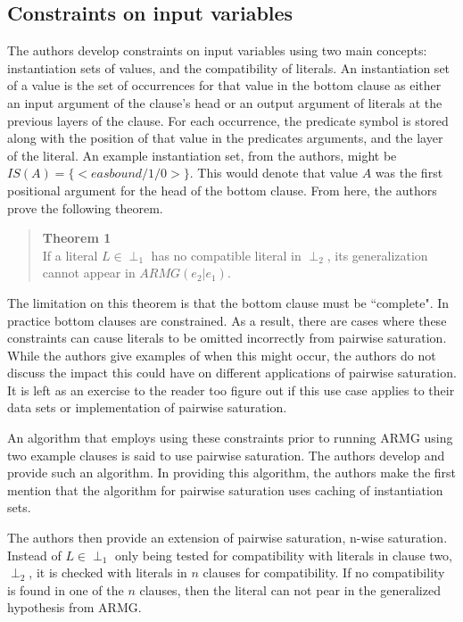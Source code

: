 \documentclass[jair,twoside,11pt,theapa]{article}
\begin{document}
\subsection{Constraints on input variables}
The authors develop constraints on input variables using two main concepts: instantiation sets of values, and the compatibility of literals. An instantiation set of a value is the set of occurrences for that value in the bottom clause as either an input argument of the clause's head or an output argument of literals at the previous layers of the clause. For each occurrence, the predicate symbol is stored along with the position of that value in the predicates arguments, and the layer of the literal. An example instantiation set, from the authors, might be $IS(A) = \{<easbound/1/0>\}$. This would denote that value $A$ was the first positional argument for the head of the bottom clause. From here, the authors prove the following theorem.

{\small
	\begin{quote}
		{\bf Theorem 1}\\
		If a literal $L \in \perp_1$ has no compatible literal in $\perp_2$, its generalization cannot appear in $ARMG(e_2|e_1)$.
	\end{quote}
}

The limitation on this theorem is that the bottom clause must be ``complete". In practice bottom clauses are constrained. As a result, there are cases where these constraints can cause literals to be omitted incorrectly from pairwise saturation. While the authors give examples of when this might occur, the authors do not discuss the impact this could have on different applications of pairwise saturation. It is left as an exercise to the reader too figure out if this use case applies to their data sets or implementation of pairwise saturation.

An algorithm that employs using these constraints prior to running ARMG using two example clauses is said to use pairwise saturation. The authors develop and provide such an algorithm. In providing this algorithm, the authors make the first mention that the algorithm for pairwise saturation uses caching of instantiation sets. 

The authors then provide an extension of pairwise saturation, n-wise saturation. Instead of $L \in \perp_1$ only being tested for compatibility with literals in clause two, $\perp_2$, it is checked with literals in $n$ clauses for compatibility. If no compatibility is found in one of the $n$ clauses, then the literal can not pear in the generalized hypothesis from ARMG.  
\end{document}
